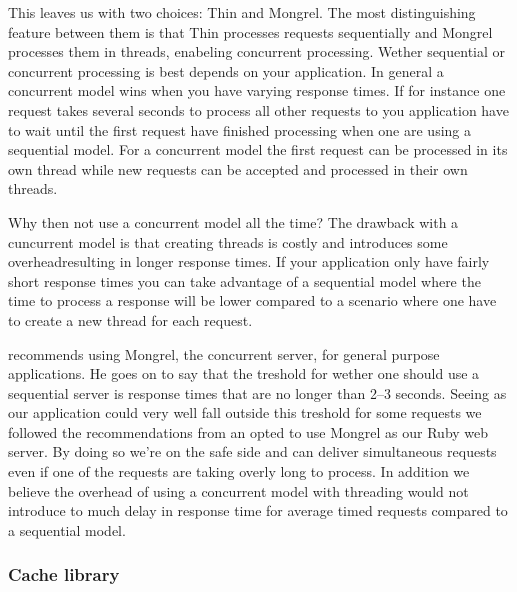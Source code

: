 \removeline

This leaves us with two choices: Thin and Mongrel. The most distinguishing
feature between them is that Thin processes requests sequentially and Mongrel
processes them in threads, enabeling concurrent processing. Wether
sequential or concurrent processing is best depends on your application.
In general a concurrent model wins when you have varying response times.
If for instance one request takes several seconds to process all other
requests to you application have to wait until the first request have
finished processing when one are using a sequential model. For a concurrent
model the first request can be processed in its own thread while new requests
can be accepted and processed in their own threads.

Why then not use a concurrent model all the time? The drawback with a
cuncurrent model is that creating threads is costly and introduces some
overhead\dash{}resulting in longer response times. If your application
only have fairly short response times you can take advantage of a
sequential model where the time to process a response will be lower compared
to a scenario where one have to create a new thread for each request.

\citet{zygmuntowicz08} recommends using Mongrel, the concurrent server,
for general purpose applications. He goes on to say that the treshold
for wether one should use a sequential server is response times that
are no longer than 2--3 seconds. Seeing as our application could very
well fall outside this treshold for some requests%
we followed the recommendations from \citeauthor{zygmuntowicz08} an opted
to use Mongrel as our Ruby web server. By doing so we're on the safe side
and can deliver simultaneous requests even if one of the requests are taking
overly long to process. In addition we believe the overhead of using a
concurrent model with threading would not introduce to much delay in
response time for average timed requests compared to a sequential model.

\subsubsection{Cache library}
\label{section:selection.stack.server.cache}

